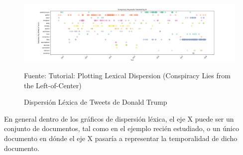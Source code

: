 \begin{enumerate}
    \begin{figure}[H]
        \centering
        \includegraphics[width=1\textwidth]{figures/Lexical_Dispersion.png}
        \caption{\label{fig:Lexical}Dispersión Léxica de Tweets de Donald Trump} Fuente: Tutorial: Plotting Lexical Dispersion (Conspiracy Lies from the Left-of-Center) \cite{Lexical_Dispersion}
    \end{figure}
    
     En general dentro de los gráficos de dispersión léxica, el eje X puede ser un conjunto de documentos, tal como en el ejemplo recién estudiado, o un único documento en dónde el eje X pasaría a representar la temporalidad de dicho documento.
     

\end{enumerate}
